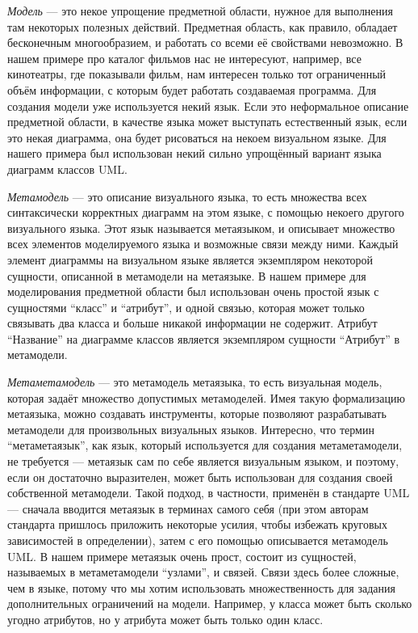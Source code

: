 \textit{Модель} --- это некое упрощение предметной области, нужное для выполнения там 
некоторых полезных действий. Предметная область, как правило, обладает 
бесконечным многообразием, и работать со всеми её свойствами невозможно. 
В нашем примере про каталог фильмов нас не интересуют, например, все кинотеатры, 
где показывали фильм, нам интересен только тот ограниченный объём информации,
с которым будет работать создаваемая программа. Для создания модели уже 
используется некий язык. Если это неформальное описание предметной области, в 
качестве языка может выступать естественный язык, если это некая диаграмма, она 
будет рисоваться на некоем визуальном языке. Для нашего примера был использован 
некий сильно упрощённый вариант языка диаграмм классов \ac{UML}.

\textit{Метамодель} --- это описание визуального языка, то есть множества всех 
синтаксически корректных диаграмм на этом языке, с помощью некоего другого 
визуального языка. Этот язык называется метаязыком, и описывает множество всех 
элементов моделируемого языка и возможные связи между ними. Каждый элемент 
диаграммы на визуальном языке является экземпляром некоторой сущности, описанной 
в метамодели на метаязыке. В нашем примере для моделирования предметной области 
был использован очень простой язык с сущностями "`класс"' и "`атрибут"', и одной 
связью, которая может только связывать два класса и больше никакой информации 
не содержит. Атрибут "`Название"' на диаграмме классов является экземпляром 
сущности "`Атрибут"' в метамодели.

\textit{Метаметамодель} --- это метамодель метаязыка, то есть визуальная модель, 
которая задаёт множество допустимых метамоделей. Имея такую формализацию 
метаязыка, можно создавать инструменты, которые позволяют разрабатывать 
метамодели для произвольных визуальных языков. Интересно, что термин 
"`метаметаязык"', как язык, который используется для создания метаметамодели, 
не требуется --- метаязык сам по себе является визуальным языком, и поэтому, 
если он достаточно выразителен, может быть использован для создания своей 
собственной метамодели. Такой подход, в частности, применён в стандарте \ac{UML} 
--- сначала вводится метаязык в терминах самого себя (при этом авторам стандарта 
пришлось приложить некоторые усилия, чтобы избежать круговых зависимостей в 
определении), затем с его помощью описывается метамодель \ac{UML}. В нашем примере 
метаязык очень прост, состоит из сущностей, называемых в метаметамодели 
"`узлами"', и связей. Связи здесь более сложные, чем в языке, потому что мы 
хотим использовать множественность для задания дополнительных ограничений на 
модели. Например, у класса может быть сколько угодно атрибутов, но у атрибута 
может быть только один класс.

